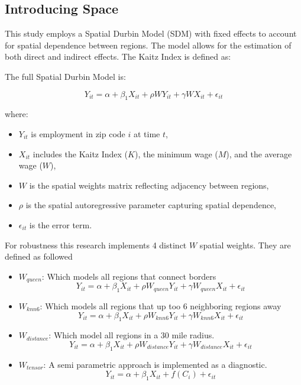 \documentclass[12pt]{article}
\begin{document}
\subsection{Introducing Space}


This study employs a Spatial Durbin Model (SDM) \cite{lee2016identification} with fixed effects to account for spatial dependence between regions.
The model allows for the estimation of both direct and indirect effects. The Kaitz Index is defined as:


The full Spatial Durbin Model is:

\[
	Y_{it} = \alpha + \beta_1 X_{it} + \rho W Y_{it} + \gamma W X_{it} + \epsilon_{it}
\]

where:
\begin{itemize}
	\item $Y_{it}$ is employment in zip code $i$ at time $t$,
	\item $X_{it}$ includes the Kaitz Index ($K$), the minimum wage ($M$), and the average wage ($W$),
	\item $W$ is the spatial weights matrix reflecting adjacency between regions,
	\item $\rho$ is the spatial autoregressive parameter capturing spatial dependence,
	\item $\epsilon_{it}$ is the error term.
\end{itemize}


For robustness this research implements 4 distinct $W$ spatial weights. They are defined as followed
\begin{itemize}
	\item $W_{queen}$: Which models all regions that connect borders
	      \[
		      Y_{it} = \alpha + \beta_1 X_{it} + \rho W_{queen} Y_{it} + \gamma W_{queen} X_{it} + \epsilon_{it}
	      \]
	\item $W_{knn6}$: Which models all regions that up too 6 neighboring regions away
	      \[
		      Y_{it} = \alpha + \beta_1 X_{it} + \rho W_{knn6} Y_{it} + \gamma W_{knn6} X_{it} + \epsilon_{it}
	      \]
	\item $W_{distance}$: Which model all regions in a 30 mile radius.
	      \[
		      Y_{it} = \alpha + \beta_1 X_{it} + \rho W_{distance} Y_{it} + \gamma W_{distance} X_{it} + \epsilon_{it}
	      \]
	\item $W_{tensor}$: A semi parametric approach is implemented as a diagnostic.
	      \[
		      Y_{it} = \alpha + \beta_1 X_{it} + f(C_i) + \epsilon_{it}
	      \]
\end{itemize}
\end{document}
